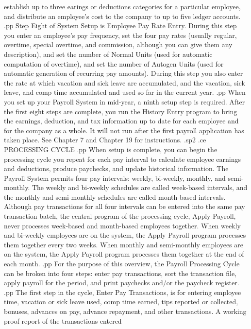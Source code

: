 establish up to three earings or deductions categories for a particular
employee, and distribute an employee's cost to the company to up
to five ledger accounts.
.pp
Step Eight of System Setup is Employee Pay Rate Entry.	During this step
you enter an employee's pay frequency, set the four
pay rates (usually regular, overtime, special overtime, and
commission, although you can give them any description), and
set the number of Normal Units (used for automatic computation of
overtime), and set the number of Autogen Units (used for automatic generation
of recurring pay amounts).  During this step you also enter the
rate at which vacation and sick leave are accumulated, and the
vacation, sick leave, and comp time accumulated and used so far in the
current year.
.pp
When you set up your Payroll System in mid-year, a ninth setup step is
required.  After the first eight steps are complete, you
run the History Entry program to bring the earnings, deduction,
and tax information up to date for each employee and for the company
as a whole.
It will not run after the first
payroll application has taken place.
See Chapter 7 and Chapter 19 for instructions.
.sp2
.ce
PROCESSING CYCLE
.pp
When setup is complete, you can begin the processing cycle
you repeat for each pay interval to calculate employee earnings and deductions,
produce paychecks, and update historical information.  The Payroll System
permits four pay intervals: weekly, bi-weekly, monthly, and semi-monthly.
The weekly and bi-weekly schedules are called week-based intervals, and
the monthly and semi-monthly schedules are called month-based intervals.
Although pay transactions for all four intervals can be entered into
the same pay transaction batch, the central program of the processing
cycle, Apply Payroll, never processes week-based and month-based
employees together.  When weekly and bi-weekly employees are
on the system, the Apply Payroll program processes them together
every two weeks.  When monthly and semi-monthly employees are on the system,
the Apply Payroll program processes them together at the end of
each month.
.pp
For the purpose of this overview, the Payroll Processing Cycle can be
broken into four steps: enter pay transactions, sort the transaction file,
apply payroll for the period, and print paychecks and/or the paycheck
register.
.pp
The first step in the cycle, Enter Pay Transactions, is for entering
employee time, vacation or sick leave used, comp time earned, tips
reported or collected, bonuses, advances on pay, advance repayment,
and other transactions.  A working proof report of the transactions entered
